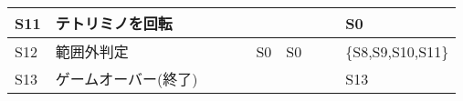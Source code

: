 \begin{landscape}
\begin{table}[htb]
\begin{tabular}{|l|l|l|l|l|l|l|l|l|l|}
S11  & テトリミノを回転     &         &                                                           &                                                          &                                                            &                                                           &         &      & S0                \\ \hline
S12  & 範囲外判定        &         &                                                           &                                                          & S0                                                         & S0                                                        &         &      & \{S8,S9,S10,S11\} \\ \hline
S13  & ゲームオーバー(終了)  &         &                                                           &                                                          &                                                            &                                                           &         &      & S13               \\ \hline
\end{tabular}
\end{table}
\end{landscape}
